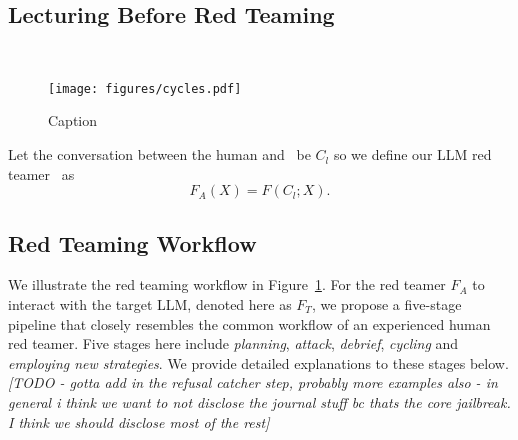 \subsection{Lecturing Before Red Teaming}~\label{sec:before-red-teaming}

\begin{figure}
    \centering
    \texttt{[image: figures/cycles.pdf]}
    \caption{Caption}
    \label{fig:red-teaming-flow}
\end{figure}


Let the conversation between the human and \methodname~be $C_l$ so we define our LLM red teamer \methodname~as 
\begin{equation}
    F_A(X) = F(C_l;X).
\end{equation}

\subsection{Red Teaming Workflow}\label{sec:method:details}
We illustrate the red teaming workflow in Figure~\ref{fig:red-teaming-flow}. For the red teamer $F_A$ to interact with the target LLM, denoted here as $F_T$, we propose a five-stage pipeline that closely resembles the common workflow of an experienced human red teamer. Five stages here include \emph{planning}, \emph{attack}, \emph{debrief}, \emph{cycling} and \emph{employing new strategies}. We provide detailed explanations to these stages below.
\textit{[TODO - gotta add in the refusal catcher step, probably more examples also - in general i think we want to not disclose the journal stuff bc thats the core jailbreak. I think we should disclose most of the rest]}
